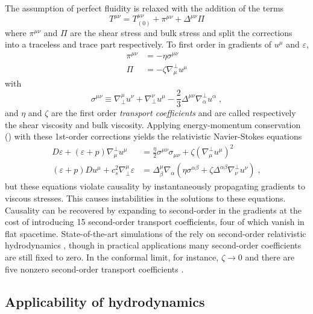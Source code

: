 The assumption of perfect fluidity is relaxed with the addition of the terms
\begin{equation}
T^{\mu\nu} = T^{\mu\nu}_{(0)} + \pi^{\mu\nu} + \Delta^{\mu\nu}\Pi
\end{equation}
where $\pi^{\mu\nu}$ and $\Pi$ are the shear stress and bulk stress and split the corrections into a traceless and trace part respectively.
To first order in gradients of $u^\mu$ and $\varepsilon$,
\begin{align}
  \label{eq:shear_stress}
  \pi^{\mu\nu} &= - \eta \sigma^{\mu\nu} \\
  \label{eq:bulk_stress}
  \Pi          &= - \zeta \nabla^\perp_\mu u^\mu
\end{align}
with
\begin{equation}
  \label{eq:sigma_tensor}
  \sigma^{\mu\nu} \equiv \nabla_\perp^\mu u^\nu + \nabla_\perp^\nu u^\mu - \frac{2}{3} \Delta^{\mu\nu}\nabla^\perp_\alpha u^\alpha \; ,
\end{equation}
and $\eta$ and $\zeta$ are the first order \emph{transport coefficients} and are called respectively the shear viscosity and bulk viscosity.
Applying energy-momentum conservation () with these 1st-order corrections yields the relativistic Navier-Stokes equations
\begin{align}
  D\varepsilon + \left(\varepsilon + p\right)\nabla^\perp_\mu u^\mu &= \frac{\eta}{2}\sigma^{\mu\nu}\sigma_{\mu\nu} + \zeta \left( \nabla^\perp_\mu u^\mu \right)^2 \\
  \left(\varepsilon + p\right)Du^\mu + c_s^2 \nabla_\perp^\mu \varepsilon &= \Delta^\mu_\beta \nabla_\alpha \left( \eta \sigma^{\alpha\beta} + \zeta \Delta^{\alpha\beta} \nabla^\perp_\nu u^\nu \right) \;,
\end{align}
but these equations violate causality by instantaneously propagating gradients to viscous stresses.
This causes instabilities in the solutions to these equations.
Causality can be recovered by expanding to second-order in the gradients \cite{Israel:1976tn} at the cost of introducing 15 second-order transport coefficients, four of which vanish in flat spacetime.
State-of-the-art simulations of the \qgp rely on second-order relativistic hydrodynamics \cite{Israel:1979wp}, though in practical applications many second-order coefficients are still fixed to zero.
In the conformal limit, for instance, $\zeta \rightarrow 0$ and there are five nonzero second-order transport coefficients \cite{Baier:2007ix}.

\subsection{Applicability of hydrodynamics}

